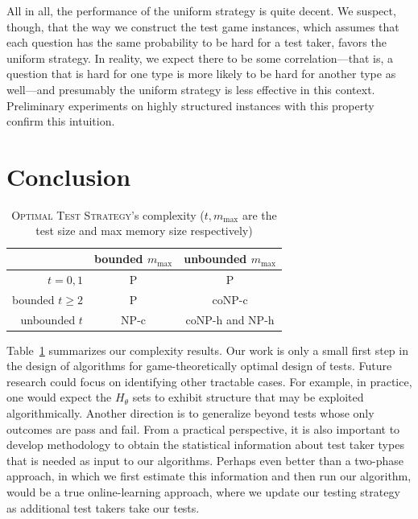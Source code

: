 \documentclass{article}
\begin{document}
All in all, the performance of the uniform strategy is quite decent.
We suspect, though, that the way we construct the test game instances, which assumes that each
question has the same probability to be hard for a test taker, favors the
uniform strategy. In reality, we expect there to be some correlation---that
is, a question that is hard for one type is more likely to be hard for
another type as well---and presumably the uniform strategy is less
effective in this context.  Preliminary experiments on highly structured instances 
with this property confirm this intuition.

\section{Conclusion}

\begin{table}
\begin{tabular}{r | c | c }
	& bounded $m_\text{max}$ & unbounded $m_\text{max}$ \\
	\hline
$t=0,1$ & P & P \\
bounded $t \geq 2$ & P & coNP-c\\
unbounded $t$ & NP-c & coNP-h and NP-h
\end{tabular}
\caption{\textsc{Optimal Test
Strategy}'s complexity ($t, m_{\max}$ are the test size and max memory size respectively)}
\label{tab:results}
\end{table}

Table~\ref{tab:results} summarizes our complexity results.
Our work is only a small first step in the design of algorithms for
game-theoretically optimal design of tests.  Future research could
focus on identifying other tractable cases.  For example, in practice,
one would expect the $H_\theta$ sets to exhibit structure that may be
exploited algorithmically.  
Another direction is to generalize beyond tests whose only outcomes
are pass and fail.
From a practical perspective, it is also
important to develop methodology to obtain the statistical information
about test taker types that is needed as input to our algorithms.
Perhaps even better than a two-phase approach, in which we first
estimate this information and then run our algorithm, would be a true
online-learning approach, where we update our testing strategy as
additional test takers take our tests.
\end{document}
